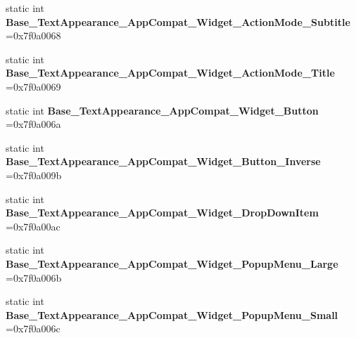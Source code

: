 \begin{DoxyCompactItemize}
\item 
\mbox{\label{classandroid_1_1support_1_1design_1_1R_1_1style_aa88c4897c5f2a2164824808dcd22554f}} 
static int {\bfseries Base\+\_\+\+Text\+Appearance\+\_\+\+App\+Compat\+\_\+\+Widget\+\_\+\+Action\+Mode\+\_\+\+Subtitle} =0x7f0a0068
\item 
\mbox{\label{classandroid_1_1support_1_1design_1_1R_1_1style_a0823e858e0b4a485e230ec9d03fb4db1}} 
static int {\bfseries Base\+\_\+\+Text\+Appearance\+\_\+\+App\+Compat\+\_\+\+Widget\+\_\+\+Action\+Mode\+\_\+\+Title} =0x7f0a0069
\item 
\mbox{\label{classandroid_1_1support_1_1design_1_1R_1_1style_ae386b5bcd0027ad2c24e07fe2ac189d2}} 
static int {\bfseries Base\+\_\+\+Text\+Appearance\+\_\+\+App\+Compat\+\_\+\+Widget\+\_\+\+Button} =0x7f0a006a
\item 
\mbox{\label{classandroid_1_1support_1_1design_1_1R_1_1style_a37d4dce86ca0fb69e90d0a91aaa6e980}} 
static int {\bfseries Base\+\_\+\+Text\+Appearance\+\_\+\+App\+Compat\+\_\+\+Widget\+\_\+\+Button\+\_\+\+Inverse} =0x7f0a009b
\item 
\mbox{\label{classandroid_1_1support_1_1design_1_1R_1_1style_ab998dc310261daf4d55f47ab95e61fab}} 
static int {\bfseries Base\+\_\+\+Text\+Appearance\+\_\+\+App\+Compat\+\_\+\+Widget\+\_\+\+Drop\+Down\+Item} =0x7f0a00ac
\item 
\mbox{\label{classandroid_1_1support_1_1design_1_1R_1_1style_ae7449949dff0e8f9a8e2af355fd83d33}} 
static int {\bfseries Base\+\_\+\+Text\+Appearance\+\_\+\+App\+Compat\+\_\+\+Widget\+\_\+\+Popup\+Menu\+\_\+\+Large} =0x7f0a006b
\item 
\mbox{\label{classandroid_1_1support_1_1design_1_1R_1_1style_ada740ef377a383ca9c8be33602a3f344}} 
static int {\bfseries Base\+\_\+\+Text\+Appearance\+\_\+\+App\+Compat\+\_\+\+Widget\+\_\+\+Popup\+Menu\+\_\+\+Small} =0x7f0a006c
\item 

\end{DoxyCompactItemize}
